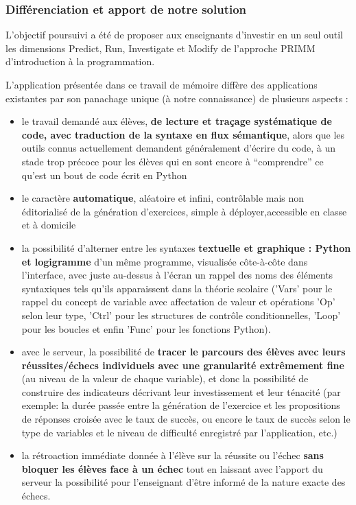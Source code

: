 \documentclass[11pt,a4paper]{article}
\begin{document}
\subsubsection{Différenciation et apport de notre solution}
L'objectif poursuivi a été de proposer aux enseignants d'investir en un seul outil les dimensions Predict, Run, Investigate et Modify de l'approche PRIMM d'introduction à la programmation. \par L'application présentée dans ce travail de mémoire diffère des applications existantes par son panachage unique (à notre connaissance) de plusieurs aspects :
\begin{itemize}
    \item le travail demandé aux élèves, \textbf{de lecture et traçage systématique de code, avec traduction de la syntaxe en flux sémantique}, alors que les outils connus actuellement demandent généralement d'écrire du code, à un stade trop précoce pour les élèves qui en sont encore à ``comprendre'' ce qu'est un bout de code écrit en Python
    \item le caractère \textbf{automatique}, aléatoire et infini, contrôlable mais non éditorialisé de la génération d'exercices, simple à déployer,accessible en classe et à domicile
    \item la possibilité d'alterner entre les syntaxes \textbf{textuelle et graphique : Python et logigramme} d'un même programme, visualisée côte-à-côte dans l'interface, avec juste au-dessus à l'écran un rappel des noms des éléments syntaxiques tels qu'ils apparaissent dans la théorie scolaire ('Vars' pour le rappel du concept de variable avec affectation de valeur et opérations 'Op' selon leur type, 'Ctrl' pour les structures de contrôle conditionnelles, 'Loop' pour les boucles et enfin 'Func' pour les fonctions Python).
    \item avec le serveur, la possibilité  de \textbf{tracer le parcours des élèves avec leurs réussites/échecs individuels avec une granularité extrêmement fine} (au niveau de la valeur de chaque variable), et donc la possibilité de construire des indicateurs décrivant leur investissement et leur ténacité (par exemple: la durée passée entre la génération de l'exercice et les propositions de réponses croisée avec le taux de succès, ou encore le taux de succès selon le type de variables et le niveau de difficulté enregistré par l'application, etc.)
    \item la rétroaction immédiate donnée à l'élève sur la réussite ou l'échec \textbf{sans bloquer les élèves face à un échec} tout en laissant avec l'apport du serveur la possibilité pour l'enseignant d'être informé de la nature exacte des échecs. 
\end{itemize}
\end{document}
